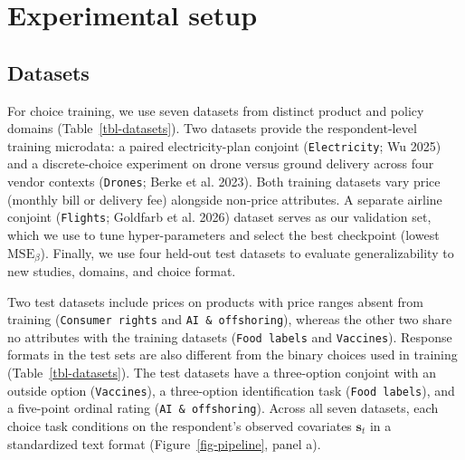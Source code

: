 \documentclass[
  11pt,
  letterpaper,
]{article}
\begin{document}
\section{Experimental setup}\label{sec-setup}

\subsection{Datasets}\label{datasets}

For choice training, we use seven datasets from distinct product and
policy domains (Table~\ref{tbl-datasets}). Two datasets provide the
respondent-level training microdata: a paired electricity-plan conjoint
(\texttt{Electricity}; Wu 2025) and a discrete-choice experiment on
drone versus ground delivery across four vendor contexts
(\texttt{Drones}; Berke et al. 2023). Both training datasets vary price
(monthly bill or delivery fee) alongside non-price attributes. A
separate airline conjoint (\texttt{Flights}; Goldfarb et al. 2026)
dataset serves as our validation set, which we use to tune
hyper-parameters and select the best checkpoint (lowest
\(\mathrm{MSE}_\beta\)). Finally, we use four held-out test datasets to
evaluate generalizability to new studies, domains, and choice format.

Two test datasets include prices on products with price ranges absent
from training (\texttt{Consumer\ rights} and
\texttt{AI\ \&\ offshoring}), whereas the other two share no attributes
with the training datasets (\texttt{Food\ labels} and
\texttt{Vaccines}). Response formats in the test sets are also different
from the binary choices used in training (Table~\ref{tbl-datasets}). The
test datasets have a three-option conjoint with an outside option
(\texttt{Vaccines}), a three-option identification task
(\texttt{Food\ labels}), and a five-point ordinal rating
(\texttt{AI\ \&\ offshoring}). Across all seven datasets, each choice
task conditions on the respondent's observed covariates \(\mathbf{s}_t\)
in a standardized text format (Figure~\ref{fig-pipeline}, panel a).
\end{document}
